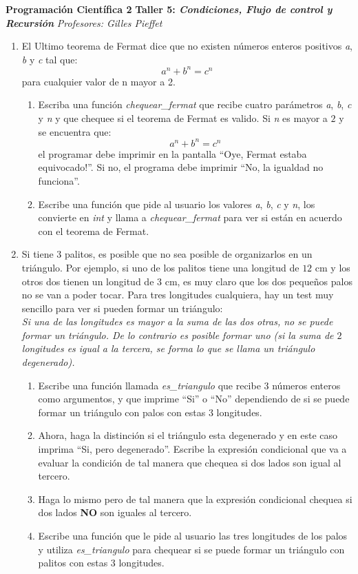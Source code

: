\documentclass[10pt, twocolumn]{article}
\begin{document}
\noindent
{\Large \bf Programación Científica 2}
\vskip 0.3cm
\noindent
{\large \bf Taller 5: {\it Condiciones, Flujo de control y Recursión}}
\vskip 0.2cm
\noindent
{\it Profesores:  Gilles Pieffet}\\


\noindent
\begin{enumerate}
\item El Ultimo teorema de Fermat dice que no existen números enteros positivos \emph{a}, \emph{b} y \emph{c} tal que:
\[ a^n + b^n = c^n \]
para cualquier valor de n mayor a 2.
\begin{enumerate}
	\item Escriba una función \emph{chequear\_fermat} que recibe cuatro parámetros \emph{a}, \emph{b}, \emph{c} y \emph{n} y que chequee si el teorema de Fermat es valido. Si \emph{n} es mayor a $2$ y se encuentra que:
	\[ a^n + b^n = c^n \]
	el programar debe imprimir en la pantalla ``Oye, Fermat estaba equivocado!''. Si no, el programa debe imprimir ``No, la igualdad no funciona''.
	\item Escribe una función que pide al usuario los valores \emph{a}, \emph{b}, \emph{c} y \emph{n}, los convierte en \emph{int} y llama a \emph{chequear\_fermat} para ver si están en acuerdo con el teorema de Fermat.
\end{enumerate}

	\item Si tiene $3$ palitos, es posible que no sea posible de organizarlos en un triángulo. Por ejemplo, si uno de los palitos tiene una longitud de $12$ cm y los otros dos tienen un longitud de $3$ cm, es muy claro que los dos pequeños palos no se van a poder tocar. Para tres longitudes cualquiera, hay un test muy sencillo para ver si pueden formar un triángulo:\\
	\vskip -4mm
	\emph{Si una de las longitudes es mayor a la suma de las dos otras, no se puede formar un triángulo. De lo contrario es posible formar uno (si la suma de $2$ longitudes es igual a la tercera, se forma lo que se llama un triángulo degenerado).}
	\begin{enumerate}
		\item Escribe una función llamada \emph{es\_triangulo} que recibe 3 números enteros como argumentos, y que imprime ``Si'' o ``No'' dependiendo de si se puede formar un triángulo con palos con estas $3$ longitudes. 
		\item Ahora, haga la distinción si el triángulo esta degenerado y en este caso imprima ``Si, pero degenerado''. Escribe la expresión condicional que va a evaluar la condición de tal manera que chequea si dos lados son igual al tercero.
		\item Haga lo mismo pero de tal manera que la expresión condicional chequea si dos lados \textbf{NO} son iguales al tercero. 
		\item Escribe una función que le pide al usuario las tres longitudes de los palos y utiliza \emph{es\_triangulo} para chequear si se puede formar un triángulo con palitos con estas $3$ longitudes.
	\end{enumerate}



\end{enumerate}
\end{document}
